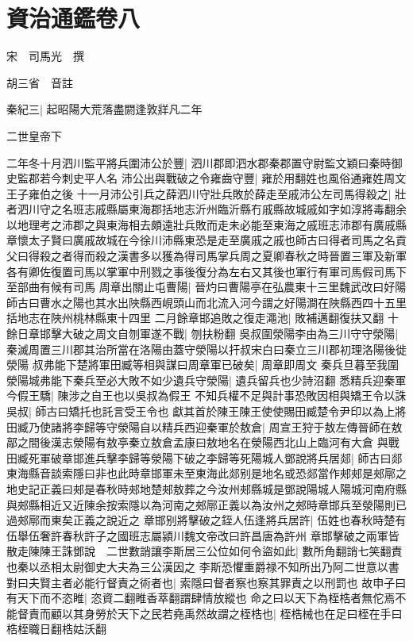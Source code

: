 \chapter{資治通鑑卷八}
宋　司馬光　撰

胡三省　音註

秦紀三|{
	起昭陽大荒落盡閼逢敦牂凡二年}


二世皇帝下

二年冬十月泗川監平將兵圍沛公於豐|{
	泗川郡即泗水郡秦郡置守尉監文穎曰秦時御史監郡若今刺史平人名}
沛公出與戰破之令雍齒守豐|{
	雍於用翻姓也風俗通雍姓周文王子雍伯之後}
十一月沛公引兵之薛泗川守壯兵敗於薛走至戚沛公左司馬得殺之|{
	壯者泗川守之名班志戚縣屬東海郡括地志沂州臨沂縣冇戚縣故城戚如字如淳將毒翻余以地理考之沛郡之與東海相去頗遠壯兵敗而走未必能至東海之戚班志沛郡有廣戚縣章懷太子賢曰廣戚故城在今徐川沛縣東恐是走至廣戚之戚也師古曰得者司馬之名貢父曰得殺之者得而殺之漢書多以獲為得司馬掌兵周之夏卿春秋之時晉置三軍及新軍各有卿佐復置司馬以掌軍中刑戮之事後復分為左右又其後也軍行有軍司馬假司馬下至部曲有候有司馬}
周章出關止屯曹陽|{
	晉灼曰曹陽亭在弘農東十三里魏武改曰好陽師古曰曹水之陽也其水出陜縣西峴頭山而北流入河今謂之好陽澗在陜縣西四十五里括地志在陜州桃林縣東十四里}
二月餘章邯追敗之復走澠池|{
	敗補邁翻復扶又翻}
十餘日章邯擊大破之周文自刎軍遂不戰|{
	刎扶粉翻}
吳叔圍滎陽李由為三川守守滎陽|{
	秦滅周置三川郡其治所當在洛陽由蓋守滎陽以扞叔宋白曰秦立三川郡初理洛陽後徙滎陽}
叔弗能下楚將軍田臧等相與謀曰周章軍已破矣|{
	周章即周文}
秦兵旦暮至我圍滎陽城弗能下秦兵至必大敗不如少遺兵守滎陽|{
	遺兵留兵也少詩沼翻}
悉精兵迎秦軍今假王驕|{
	陳涉之自王也以吳叔為假王}
不知兵權不足與計事恐敗因相與矯王令以誅吳叔|{
	師古曰矯托也託言受王令也}
獻其首於陳王陳王使使賜田臧楚令尹印以為上將田臧乃使諸將李歸等守滎陽自以精兵西迎秦軍於敖倉|{
	周宣王狩于敖左傳晉師在敖鄗之間後漢志滎陽有敖亭秦立敖倉孟康曰敖地名在滎陽西北山上臨河有大倉}
與戰田臧死軍破章邯進兵擊李歸等滎陽下破之李歸等死陽城人鄧說將兵居郯|{
	師古曰郯東海縣音談索隱曰非也此時章邯軍未至東海此郯别是地名或恐郯當作郟郟是郟鄏之地史記正義曰郟是春秋時郟地楚郟敖葬之今汝州郟縣城是鄧說陽城人陽城河南府縣與郟縣相近又近陳余按索隱以為河南之郟鄏正義以為汝州之郟時章邯兵至滎陽則已過郟鄏而東矣正義之說近之}
章邯别將擊破之銍人伍逢將兵居許|{
	伍姓也春秋時楚有伍舉伍奢許春秋許子之國班志屬潁川魏文帝改曰許昌唐為許州}
章邯擊破之兩軍皆散走陳陳王誅鄧說　二世數誚讓李斯居三公位如何令盜如此|{
	數所角翻誚七笑翻責也秦以丞相太尉御史大夫為三公漢因之}
李斯恐懼重爵禄不知所出乃阿二世意以書對曰夫賢主者必能行督責之術者也|{
	索隱曰督者察也察其罪責之以刑罰也}
故申子曰有天下而不恣睢|{
	恣資二翻睢香萃翻謂肆情放縱也}
命之曰以天下為桎梏者無佗焉不能督責而顧以其身勞於天下之民若堯禹然故謂之桎梏也|{
	桎梏械也在足曰桎在手曰梏桎職日翻梏姑沃翻}
